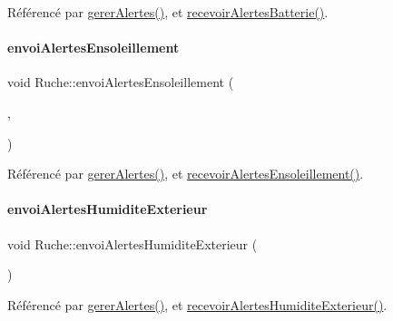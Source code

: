 Référencé par \hyperlink{class_ruche_a80f3538f081aea887d7199f114dfca01}{gerer\+Alertes()}, et \hyperlink{class_ruche_aee278a316c2e462e43705e15a36ab43f}{recevoir\+Alertes\+Batterie()}.

\mbox{\label{class_ruche_aa3d500a4a0e5ed60da000af15000505e}} 
\paragraph{\texorpdfstring{envoi\+Alertes\+Ensoleillement}{envoiAlertesEnsoleillement}}
{\footnotesize\ttfamily void Ruche\+::envoi\+Alertes\+Ensoleillement (\begin{DoxyParamCaption}\item[{\hyperlink{parametres_8h_aaa6de8207c94675264c90b10b613368d}{Seuils\+Alertes}}]{,  }\item[{double}]{ }\end{DoxyParamCaption})\hspace{0.3cm}{\ttfamily [signal]}}



Référencé par \hyperlink{class_ruche_a80f3538f081aea887d7199f114dfca01}{gerer\+Alertes()}, et \hyperlink{class_ruche_afdfb0cff676b6de5f421aed01c3d49db}{recevoir\+Alertes\+Ensoleillement()}.

\mbox{\label{class_ruche_abef2fd2fdeaee8bc19fa1ce13b32f4d0}} 
\paragraph{\texorpdfstring{envoi\+Alertes\+Humidite\+Exterieur}{envoiAlertesHumiditeExterieur}}
{\footnotesize\ttfamily void Ruche\+::envoi\+Alertes\+Humidite\+Exterieur (\begin{DoxyParamCaption}\item[{\hyperlink{parametres_8h_aaa6de8207c94675264c90b10b613368d}{Seuils\+Alertes}}]{ }\end{DoxyParamCaption})\hspace{0.3cm}{\ttfamily [signal]}}



Référencé par \hyperlink{class_ruche_a80f3538f081aea887d7199f114dfca01}{gerer\+Alertes()}, et \hyperlink{class_ruche_a6b12ebe7e83f12b31e49b44e25fdfa58}{recevoir\+Alertes\+Humidite\+Exterieur()}.

